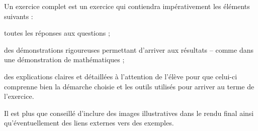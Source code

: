 Un exercice complet est un exercice qui contiendra impérativement les éléments suivants :
\item toutes les réponses aux questions ;
\item des démonstrations rigoureuses permettant d'arriver aux résultats -- comme dans une démonstration de mathématiques ;
\item des explications claires et détaillées à l'attention de l'élève pour que celui-ci comprenne bien la démarche choisie et les outils utilisés pour arriver au terme de l'exercice.

Il est plus que conseillé d'inclure des images illustratives dans le rendu final ainsi qu'éventuellement des liens externes vers des exemples.